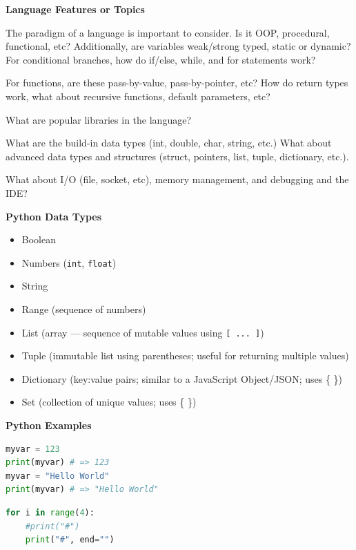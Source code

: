 {\vspace{11pt}
\textbf{Language Features or Topics}
\vspace{11pt}

The paradigm of a language is important to consider. Is it OOP, procedural, functional, etc? Additionally, are variables weak/strong typed, static or dynamic? For conditional branches, how do if/else, while, and for statements work?

For functions, are these pass-by-value, pass-by-pointer, etc? How do return types work, what about recursive functions, default parameters, etc?

What are popular libraries in the language? 

What are the build-in data types (int, double, char, string, etc.) What about advanced data types and structures (struct, pointers, list, tuple, dictionary, etc.).

What about I/O (file, socket, etc), memory management, and debugging and the IDE?

\vspace{11pt}
\textbf{Python Data Types}
\vspace{11pt}

\begin{itemize}
  \item Boolean
  \item Numbers (\texttt{int}, \texttt{float})
  \item String
  \item Range (sequence of numbers)
  \item List (array — sequence of mutable values using \texttt{[ ... ]})
  \item Tuple (immutable list using parentheses; useful for returning multiple values)
  \item Dictionary (key:value pairs; similar to a JavaScript Object/JSON; uses \{ \})
  \item Set (collection of unique values; uses \{ \})
\end{itemize}


\vspace{11pt}
\textbf{Python Examples}
\vspace{11pt}


\begin{lstlisting}[language=Python, breaklines=true]
myvar = 123
print(myvar) # => 123
myvar = "Hello World"
print(myvar) # => "Hello World"
\end{lstlisting}
\vspace{11pt}
\begin{lstlisting}[language=Python, breaklines=true]
for i in range(4):
    #print("#")
    print("#", end="")


\end{lstlisting}}
